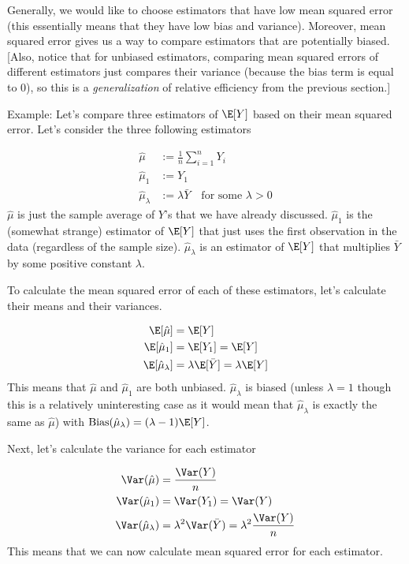 \documentclass[
  letterpaper,
  DIV=11,
  numbers=noendperiod]{scrreprt}
\begin{document}
Generally, we would like to choose estimators that have low mean squared
error (this essentially means that they have low bias and variance).
Moreover, mean squared error gives us a way to compare estimators that
are potentially biased. {[}Also, notice that for unbiased estimators,
comparing mean squared errors of different estimators just compares
their variance (because the bias term is equal to 0), so this is a
\emph{generalization} of relative efficiency from the previous
section.{]}

{Example: }Let's compare three estimators of \(\E[Y]\) based on their
mean squared error. Let's consider the three following estimators

\[
  \begin{aligned}
    \hat{\mu} &:= \frac{1}{n} \sum_{i=1}^n Y_i \\
    \hat{\mu}_1 &:= Y_1 \\
    \hat{\mu}_\lambda &:= \lambda \bar{Y} \quad \textrm{for some } \lambda > 0 
  \end{aligned}
\] \(\hat{\mu}\) is just the sample average of \(Y\)'s that we have
already discussed. \(\hat{\mu}_1\) is the (somewhat strange) estimator
of \(\E[Y]\) that just uses the first observation in the data
(regardless of the sample size). \(\hat{\mu}_\lambda\) is an estimator
of \(\E[Y]\) that multiplies \(\bar{Y}\) by some positive constant
\(\lambda\).

To calculate the mean squared error of each of these estimators, let's
calculate their means and their variances.

\[
  \begin{aligned}
    \E[\hat{\mu}] &= \E[Y] \\
    \E[\hat{\mu}_1] &= \E[Y_1] = \E[Y] \\
    \E[\hat{\mu}_\lambda] &= \lambda \E[\bar{Y}] = \lambda \E[Y]
  \end{aligned}
\] This means that \(\hat{\mu}\) and \(\hat{\mu}_1\) are both unbiased.
\(\hat{\mu}_\lambda\) is biased (unless \(\lambda=1\) though this is a
relatively uninteresting case as it would mean that
\(\hat{\mu}_\lambda\) is exactly the same as \(\hat{\mu}\)) with
\(\textrm{Bias}(\hat{\mu}_\lambda) = (\lambda - 1) \E[Y]\).

Next, let's calculate the variance for each estimator

\[
  \begin{aligned}
  \Var(\hat{\mu}) &= \frac{\Var(Y)}{n} \\
  \Var(\hat{\mu}_1) &= \Var(Y_1) = \Var(Y) \\
  \Var(\hat{\mu}_\lambda) &= \lambda^2 \Var(\bar{Y}) = \lambda^2 \frac{\Var(Y)}{n}
  \end{aligned}
\] This means that we can now calculate mean squared error for each
estimator.
\end{document}
